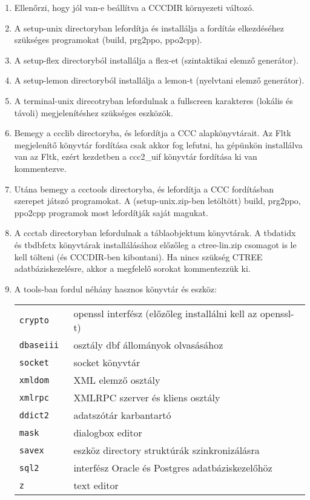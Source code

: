 \begin{enumerate}
\item
Ellenőrzi, hogy jól van-e beállítva a CCCDIR környezeti
változó.

\item
A setup-unix directoryban lefordítja és installálja a fordítás
elkezdéséhez szükséges programokat (build, prg2ppo, ppo2cpp).

\item
A setup-flex directoryból installálja a flex-et (szintaktikai elemző
generátor).

\item
A setup-lemon directoryból installálja a lemon-t (nyelvtani
elemző generátor).

\item
A terminal-unix direcotryban lefordulnak a fullscreen karakteres 
(lokális és távoli) megjelenítéshez  szükséges eszközök.

\item
Bemegy a ccclib directoryba, és lefordítja a CCC alapkönyvtárait.
Az Fltk megjelenítő könyvtár fordítása csak akkor fog lefutni,
ha  gépünkön installálva van az Fltk, ezért
kezdetben a ccc2\_uif könyvtár fordítása ki van kommentezve.

\item
Utána bemegy a ccctools directoryba, és lefordítja a CCC fordításban
szerepet játszó programokat. A (setup-unix.zip-ben letöltött)
build, prg2ppo, ppo2cpp programok most lefordítják saját magukat.

\item
A ccctab directoryban lefordulnak a táblaobjektum könyvtárak.
A tbdatidx és tbdbfctx könyvtárak installálásához előzőleg a ctree-lin.zip
csomagot is le kell tölteni (és CCCDIR-ben kibontani). Ha nincs
szükség CTREE adatbáziskezelésre, akkor a megfelelő sorokat 
kommentezzük ki.

\item
A tools-ban fordul néhány hasznos könyvtár és eszköz:
\begin{tabular}{ll}
\tt  crypto   & openssl interfész (előzőleg installálni kell az openssl-t) \\
\tt  dbaseiii & osztály dbf állományok olvasásához \\ 
\tt  socket   & socket könyvtár \\ 
\tt  xmldom   & XML elemző osztály \\
\tt  xmlrpc   & XMLRPC szerver és kliens osztály \\ 
\tt  ddict2   & adatszótár karbantartó \\ 
\tt  mask     & dialogbox editor \\ 
\tt  savex    & eszköz directory struktúrák szinkronizálásra \\ 
\tt  sql2     & interfész Oracle és Postgres adatbáziskezelőhöz \\ 
\tt  z        & text editor \\ 
\end{tabular}
\end{enumerate}

